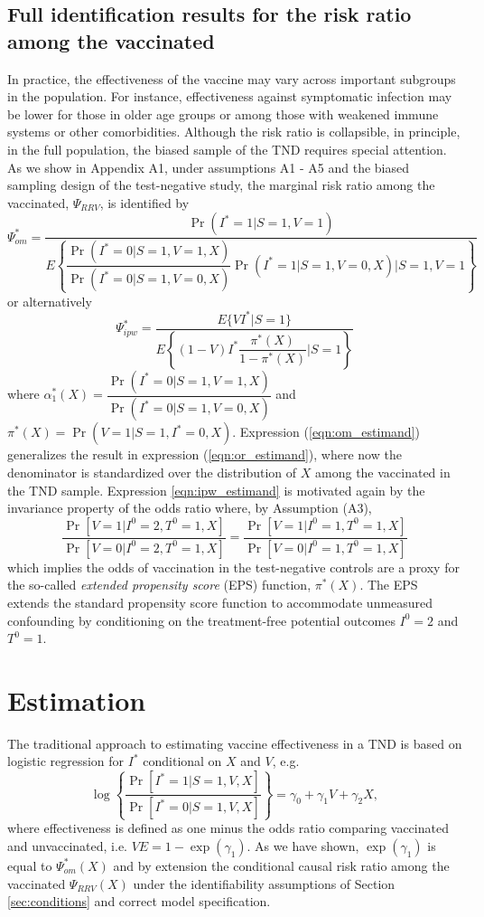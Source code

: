 \documentclass[11pt]{article}
\begin{document}
\subsection{Full identification results for the risk ratio among the vaccinated}
In practice, the effectiveness of the vaccine may vary across important subgroups in the population. For instance, effectiveness against symptomatic infection may be lower for those in older age groups or among those with weakened immune systems or other comorbidities. Although the risk ratio is collapsible, in principle, in the full population, the biased sample of the TND requires special attention. As we show in Appendix A1, under assumptions A1 - A5 and the biased sampling design of the test-negative study, the marginal risk ratio among the vaccinated, $\Psi_{RRV}$, is identified by
\begin{equation}\label{eqn:om_estimand}
    \Psi_{om}^* = \dfrac{\Pr(I^* = 1 | S = 1, V = 1)}{E\left\{  \dfrac{\Pr(I^* = 0 | S = 1, V = 1, X)}{\Pr(I^* = 0| S = 1, V = 0, X)}\Pr(I^* = 1 | S = 1, V = 0, X) \Big| S = 1, V = 1 \right\}}
\end{equation}
or alternatively 
\begin{equation}\label{eqn:ipw_estimand}
    \Psi_{ipw}^* = \dfrac{E\{VI^*|S =1\}}{E\left\{ (1 - V) I^* \dfrac{\pi^*(X)}{1 - \pi^*(X)} \bigg| S = 1\right\}}
\end{equation}
where $\alpha^*_1(X) = \dfrac{\Pr(I^* = 0 | S = 1, V = 1, X)}{\Pr(I^* = 0| S = 1, V = 0, X)}$ and $\pi^*(X) = \Pr(V = 1| S = 1, I^* = 0, X)$. Expression (\ref{eqn:om_estimand}) generalizes the result in expression (\ref{eqn:or_estimand}), where now the denominator is standardized over the distribution of $X$ among the vaccinated in the TND sample. Expression \ref{eqn:ipw_estimand} is motivated again by the invariance property of the odds ratio where, by Assumption (A3), 
$$\frac{\Pr[V = 1 | I^0 = 2, T^0 = 1, X]}{\Pr[ V = 0 | I^0 = 2, T^0 = 1, X]} =\frac{\Pr[V = 1 | I^0 = 1, T^0 = 1, X]}{\Pr[V = 0 | I^0 = 1, T^0 = 1, X]}$$
which implies the odds of vaccination in the test-negative controls are a proxy for the so-called \textit{extended propensity score} (EPS) function, $\pi^*(X)$. The EPS extends the standard propensity score function to accommodate unmeasured confounding by conditioning on the treatment-free potential outcomes $I^0 = 2$ and $T^0 = 1$. 

\section{Estimation}
The traditional approach to estimating vaccine effectiveness in a TND is based on logistic regression for $I^*$ conditional on $X$ and $V$, e.g.
$$\log \left\{\dfrac{\Pr[I^* = 1 | S = 1, V, X]}{\Pr[I^* = 0 | S = 1, V, X]}\right\} = \gamma_0 + \gamma_1 V + \gamma_2 X,$$
where effectiveness is defined as one minus the odds ratio comparing vaccinated and unvaccinated, i.e. $VE = 1 - \exp(\gamma_1)$. As we have shown, $ \exp(\gamma_1)$ is equal to $\Psi^*_{om}(X)$ and by extension the conditional causal risk ratio among the vaccinated $\Psi_{RRV}(X)$ under the identifiability assumptions of Section \ref{sec:conditions} and correct model specification. 
\end{document}
